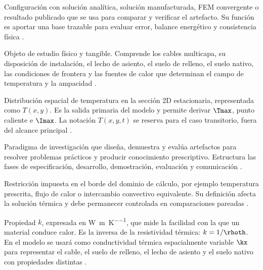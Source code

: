 \begin{description}[style=nextline,itemsep=0.5\baselineskip,parsep=0pt,topsep=0.25\baselineskip]
  \item[Caso de referencia o \textit{benchmark}.] Configuración con solución analítica, solución manufacturada, FEM convergente o resultado publicado que se usa para comparar y verificar el artefacto. Su función es aportar una base trazable para evaluar error, balance energético y consistencia física \parencites{cigre2022}[93--99]{cigre2025}.

  \item[Arreglo de cables--entorno térmico.] Objeto de estudio físico y tangible. Comprende los cables multicapa, su disposición de instalación, el lecho de asiento, el suelo de relleno, el suelo nativo, las condiciones de frontera y las fuentes de calor que determinan el campo de temperatura y la ampacidad \parencites[752--760]{neher1957}{anders2005}[3--5]{enescu2020}[4--6]{enescu2021}[1,10,16]{kim2025}.

  \item[Campo de temperatura.] Distribución espacial de temperatura en la sección 2D estacionaria, representada como $T(x,y)$. Es la salida primaria del modelo y permite derivar $\Tmax$, punto caliente e $\Imax$. La notación $T(x,y,t)$ se reserva para el caso transitorio, fuera del alcance principal \parencites{carslaw1959conduction,kakac2018heatConduction,hahn2012heatConduction}[1,3,16]{pan2025}.

  \item[Ciencia del diseño o DSR.] Paradigma de investigación que diseña, demuestra y evalúa artefactos para resolver problemas prácticos y producir conocimiento prescriptivo. Estructura las fases de especificación, desarrollo, demostración, evaluación y comunicación \parencites[54--56]{peffers2007}[342--351]{gregor2013}[198--203]{delport2024}.

  \item[Condición de contorno.] Restricción impuesta en el borde del dominio de cálculo, por ejemplo temperatura prescrita, flujo de calor o intercambio convectivo equivalente. Su definición afecta la solución térmica y debe permanecer controlada en comparaciones pareadas \parencites{carslaw1959conduction,kakac2018heatConduction,hahn2012heatConduction}[3--5]{enescu2020}[3--4,93--99]{cigre2025}.

  \item[Conductividad térmica.] Propiedad $k$, expresada en \si{\watt\per\metre\per\kelvin}, que mide la facilidad con la que un material conduce calor. Es la inversa de la resistividad térmica: $k=1/\rhoth$. En el modelo se usará como conductividad térmica espacialmente variable $\kx$ para representar el cable, el suelo de relleno, el lecho de asiento y el suelo nativo con propiedades distintas \parencites{carslaw1959conduction,kakac2018heatConduction}{farouki1981thermal,devries1966thermal}[1,7]{khumalo2025}[secciones 4--6]{ieee442}.


\end{description}
